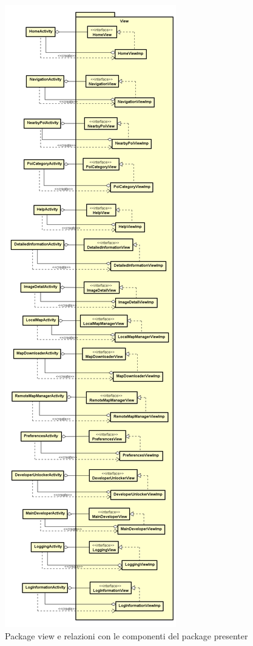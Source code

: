 \documentclass[../DefinizioneDiProdotto.tex,lanscape]{subfiles}
\begin{document}
\begin{figure}[h]
	\centering
	\includegraphics[height=0.9\textheight, width=\textwidth, keepaspectratio]{diagrams/ModelCompleteNoMethods/PNGpackage/view}
	\caption{Package view e relazioni con le componenti del package presenter}
	\label{viewPackage}
\end{figure}
\end{document}
